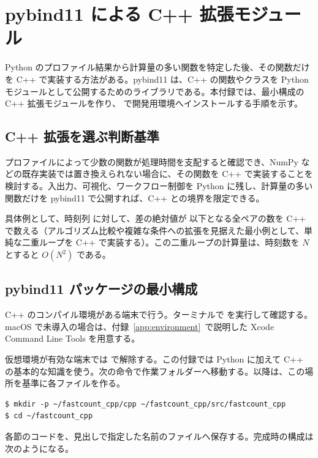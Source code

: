 \chapter{pybind11 による C++ 拡張\mbox{モジュール}}
\label{app:pybind11}

Python のプロファイル結果から計算量の多い関数を特定した後、その関数だけを C++ で実装する方法がある。pybind11 は、C++ の関数やクラスを Python モジュールとして公開するためのライブラリである。本付録では、最小構成の C++ 拡張モジュールを作り、 で開発用環境へインストールする手順を示す。

\section{C++ 拡張を選ぶ判断基準}

プロファイルによって少数の関数が処理時間を支配すると確認でき、NumPy などの既存実装では置き換えられない場合に、その関数を C++ で実装することを検討する。入出力、可視化、ワークフロー制御を Python に残し、計算量の多い関数だけを pybind11 で公開すれば、C++ との境界を限定できる。

具体例として、時刻列  に対して、差の絶対値が  以下となる全ペアの数を C++ で数える（アルゴリズム比較や複雑な条件への拡張を見据えた最小例として、単純な二重ループを C++ で実装する）。この二重ループの計算量は、時刻数を \(N\) とすると \(O(N^2)\) である。

\section{pybind11 パッケージの最小構成}

C++ のコンパイル環境がある端末で行う。ターミナルで  を実行して確認する。macOS で未導入の場合は、付録~\ref{app:environment}~で説明した Xcode Command Line Tools を用意する。

仮想環境が有効な端末では  で解除する。この付録では Python に加えて C++ の基本的な知識を使う。次の命令で作業フォルダーへ移動する。以降は、この場所を基準に各ファイルを作る。
\begin{lstlisting}[numbers=none, xleftmargin=2\zw]
$ mkdir -p ~/fastcount_cpp/cpp ~/fastcount_cpp/src/fastcount_cpp
$ cd ~/fastcount_cpp
\end{lstlisting}
各節のコードを、見出しで指定した名前のファイルへ保存する。完成時の構成は次のようになる。

